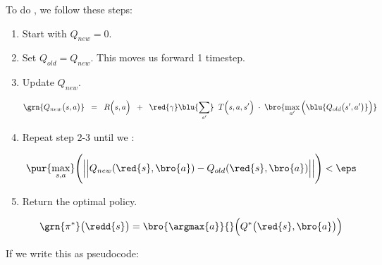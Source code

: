         \begin{definition}
             To do , we follow these steps:

             \begin{enumerate}
                 \item Start with $Q_{new}=0$.
                 \item Set $Q_{old} = Q_{new}$. This moves us forward 1 timestep. 
                 \item Update $Q_{new}$.

                 \begin{equation*}
                    \grn{Q_{new}\big(s,a \big)} \;\;=\;\; 
                            R \Big( s,a \Big)
                        \;\;+\;\;
                        \red{\gamma}
                        \blu{\sum_{s'}}  
                            \;\;
                            T \Big(          s,a,s' \Big)
                            \;\cdot\; 
                            \bro{ \max_{a'} \Big( \blu{Q_{old}\big(s',a' \big)} \Big)}
                \end{equation*}

                \item Repeat step 2-3 until we :

                    \begin{equation*}
                         \pur{\max_{s,a}}
                            \Bigg(
                            \Big|\Big|
                                Q_{new}(\red{s},\bro{a}) - Q_{old}(\red{s},\bro{a})
                            \Big|\Big|
                            \Bigg) < \eps
                     \end{equation*}

                 \item Return the optimal policy. 

                    \begin{equation*}
                        \grn{\pi^*}\big(\redd{s}\big) = 
                        \bro{\argmax{a}}{} \Big( 
                            Q^{*}\big(\red{s}, \bro{a} \big) 
                        \Big)
                    \end{equation*}
             \end{enumerate}
         \end{definition}

        If we write this as pseudocode:
         
